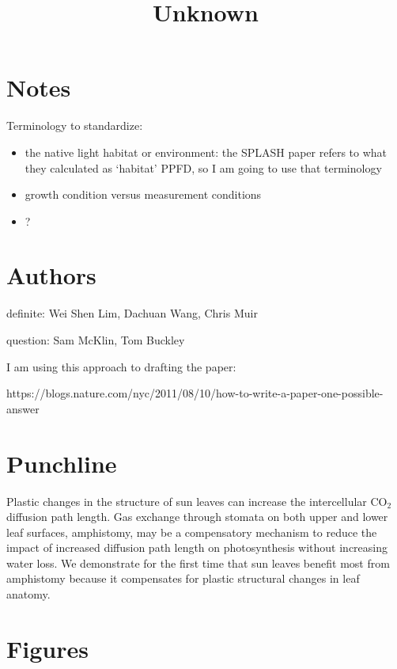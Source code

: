 \documentclass[
  letterpaper,
  DIV=11,
  numbers=noendperiod]{scrartcl}
\title{Unknown}
\author{}
\date{}
\renewcommand*\contentsname{Table of contents}
\newcommand\contentsname{Table of contents}
\begin{document}
\maketitle

\renewcommand*\contentsname{Table of contents}
{
\hypersetup{linkcolor=}
\setcounter{tocdepth}{3}
\tableofcontents
}
\section{Notes}\label{notes}

Terminology to standardize:

\begin{itemize}
\item
  the native light habitat or environment: the SPLASH paper refers to
  what they calculated as `habitat' PPFD, so I am going to use that
  terminology
\item
  growth condition versus measurement conditions
\item
  ?
\end{itemize}

\section{Authors}\label{authors}

definite: Wei Shen Lim, Dachuan Wang, Chris Muir

question: Sam McKlin, Tom Buckley

I am using this approach to drafting the paper:

https://blogs.nature.com/nyc/2011/08/10/how-to-write-a-paper-one-possible-answer

\section{Punchline}\label{punchline}

Plastic changes in the structure of sun leaves can increase the
intercellular CO\(_2\) diffusion path length. Gas exchange through
stomata on both upper and lower leaf surfaces, amphistomy, may be a
compensatory mechanism to reduce the impact of increased diffusion path
length on photosynthesis without increasing water loss. We demonstrate
for the first time that sun leaves benefit most from amphistomy because
it compensates for plastic structural changes in leaf anatomy.

\section{Figures}\label{figures}
\end{document}
